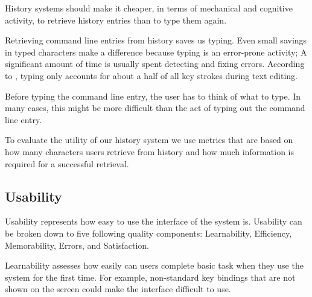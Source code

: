 History systems should make it cheaper, in terms of mechanical and cognitive activity, to retrieve history entries than to type them again.\cite{greenberg1993computer}

Retrieving command line entries from history saves us typing. Even small savings in typed characters make a difference because typing is an error-prone activity; A significant amount of time is usually spent detecting and fixing errors. According to \cite{whiteside1982people}, typing only accounts for about a half of all key strokes during text editing. 


Before typing the command line entry, the user has to think of what to type. In many cases, this might be more difficult than the act of typing out the command line entry.   


To evaluate the utility of our history system we use metrics that are based on how many characters users retrieve from history and how much information is required for a successful retrieval.

\subsection{Usability}

Usability represents how easy to use the interface of the system is. Usability can be broken down to five following quality components: Learnability, Efficiency, Memorability, Errors, and Satisfaction.\cite{nielsen2012usability}


Learnability assesses how easily can users complete basic task when they use the system for the first time. For example, non-standard key bindings that are not shown on the screen could make the interface difficult to use.


